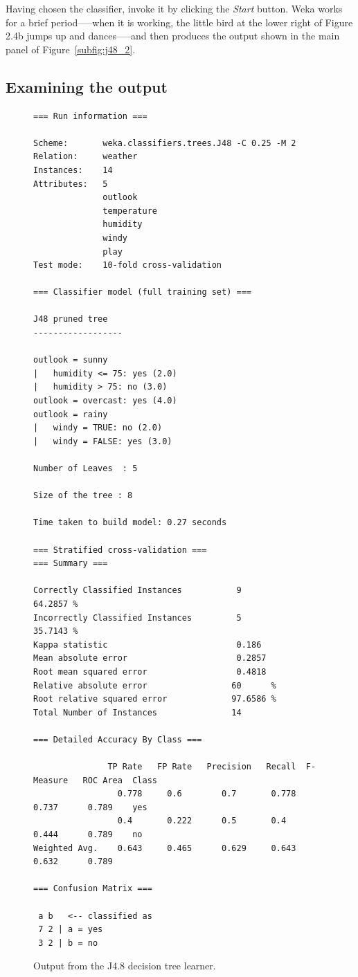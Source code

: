 Having chosen the classifier, invoke it by clicking the \textit{Start}
button. Weka works for a brief period—--when it is working, the little
bird at the lower right of Figure 2.4b jumps up and dances--—and then
produces the output shown in the main panel of
Figure~\ref{subfig:j48_2}.

\subsection{Examining the output}

\begin{figure}[!th]
\begin{mdframed}[innermargin=-1cm]
\begin{Verbatim}[fontsize=\footnotesize]
=== Run information ===

Scheme:       weka.classifiers.trees.J48 -C 0.25 -M 2
Relation:     weather
Instances:    14
Attributes:   5
              outlook
              temperature
              humidity
              windy
              play
Test mode:    10-fold cross-validation

=== Classifier model (full training set) ===

J48 pruned tree
------------------

outlook = sunny
|   humidity <= 75: yes (2.0)
|   humidity > 75: no (3.0)
outlook = overcast: yes (4.0)
outlook = rainy
|   windy = TRUE: no (2.0)
|   windy = FALSE: yes (3.0)

Number of Leaves  : 5

Size of the tree : 8

Time taken to build model: 0.27 seconds

=== Stratified cross-validation ===
=== Summary ===

Correctly Classified Instances           9               64.2857 %
Incorrectly Classified Instances         5               35.7143 %
Kappa statistic                          0.186 
Mean absolute error                      0.2857
Root mean squared error                  0.4818
Relative absolute error                 60      %
Root relative squared error             97.6586 %
Total Number of Instances               14     

=== Detailed Accuracy By Class ===

               TP Rate   FP Rate   Precision   Recall  F-Measure   ROC Area  Class
                 0.778     0.6        0.7       0.778     0.737      0.789    yes
                 0.4       0.222      0.5       0.4       0.444      0.789    no
Weighted Avg.    0.643     0.465      0.629     0.643     0.632      0.789

=== Confusion Matrix ===

 a b   <-- classified as
 7 2 | a = yes
 3 2 | b = no
\end{Verbatim}
\end{mdframed}
\caption{\label{fig:j48_output}Output from the J4.8 decision tree learner.}
\end{figure}

